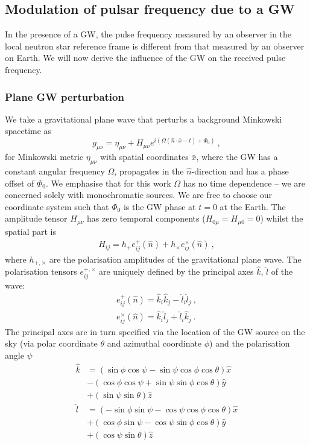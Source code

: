 \documentclass[fleqn,usenatbib,useAMS]{mnras}
\begin{document}
\subsection{Modulation of pulsar frequency due to a GW} \label{sec:psr_measured}
In the presence of a GW, the pulse frequency measured by an observer in the local neutron star reference frame is different from that measured by an observer on Earth. We will now derive the influence of the GW on the received pulse frequency.

\subsubsection{Plane GW perturbation}
We take a gravitational plane wave that perturbs a background Minkowski spacetime as
\begin{equation}
	g_{\mu \nu} = \eta_{\mu \nu} + H_{\mu \nu} e^{i(\Omega(\hat{n} \cdot \bar{x} - t) + \Phi_0)} \ ,
\end{equation}
for Minkowski metric $ \eta_{\mu \nu}$ with spatial coordinates $\bar{x}$, where the GW has a constant angular frequency $\Omega$, propagates in the $\hat{n}$-direction and has a phase offset of  $\Phi_0$. We emphasise that for this work $\Omega$ has no time dependence -- we are concerned solely with monochromatic sources. We are free to choose our coordinate system such that $\Phi_0$ is the GW phase at $t=0$ at the Earth. The amplitude tensor $H_{\mu \nu}$ has zero temporal components ($H_{0 \mu} = H_{\mu 0} = 0$) whilst the spatial part is
\begin{align}
	H_{ij} = h_+ e_{ij}^+(\hat{n}) + h_{\times} e_{ij}^{\times}(\hat{n}) \ ,
\end{align}
where $h_{+,\times}$ are the polarisation amplitudes of the gravitational plane wave. The polarisation tensors $e_{ij}^{+,\times}$ are uniquely defined by the principal axes $\hat{k}$, $\hat{l}$ of the wave:
\begin{align}
	e_{i j}^{+}(\hat{n}) =\hat{k}_i \hat{k}_j-\hat{l}_i \hat{l}_j \ , \\
		e_{i j}^{\times}(\hat{n}) =\hat{k}_i \hat{l}_j+\hat{l}_i \hat{k}_j \ .
\end{align}
The principal axes are in turn specified via the location of the GW source on the sky (via polar coordinate $\theta$ and azimuthal coordinate $\phi$) and the polarisation angle $\psi$
\begin{align}
	\hat{k} & =(\sin \phi \cos \psi-\sin \psi \cos \phi \cos \theta) \hat{x} \nonumber \\
	& -(\cos \phi \cos \psi+\sin \psi \sin \phi \cos \theta) \hat{y} \nonumber \\
	& +(\sin \psi \sin \theta) \hat{z} \\
	\hat{l} & =(-\sin \phi \sin \psi-\cos \psi \cos \phi \cos \theta) \hat{x} \nonumber \\
	& +(\cos \phi \sin \psi-\cos \psi \sin \phi \cos \theta) \hat{y}\nonumber  \\
	& +(\cos \psi \sin \theta) \hat{z}
\end{align}
\end{document}
